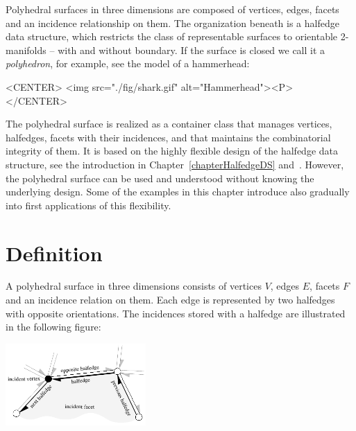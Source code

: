 Polyhedral surfaces in three dimensions are composed of vertices,
edges, facets and an incidence relationship on them. The organization
beneath is a halfedge data structure, which restricts the class of
representable surfaces to orientable 2-manifolds -- with and without
boundary. If the surface is closed we call it a {\em polyhedron}, for
example, see the  model of a hammerhead:

\begin{ccHtmlOnly}
    <CENTER>
        <img src="./fig/shark.gif" alt="Hammerhead"><P>
    </CENTER>
\end{ccHtmlOnly}

The polyhedral surface is realized as a container class that manages
vertices, halfedges, facets with their incidences, and that maintains
the combinatorial integrity of them. It is based on the highly
flexible design of the halfedge data structure, see the introduction
in Chapter~\ref{chapterHalfedgeDS} and~\cite{k-ugpdd-99}. However, the
polyhedral surface can be used and understood without knowing the
underlying design. Some of the examples in this chapter introduce also
gradually into first applications of this flexibility.

\section{Definition}
  
A polyhedral surface  in
three dimensions consists of vertices $V$, edges $E$, facets $F$ and
an incidence relation on them.  Each edge is represented by two
halfedges with opposite orientations. The incidences stored with a
halfedge are illustrated in the following figure:

\begin{ccTexOnly}
    \vspace{-7mm}
    \begin{center}
      \parbox{0.4\textwidth}{%
          \includegraphics[width=0.4\textwidth]{Polyhedron/fig/halfedge}%
      }
    \end{center}
    \vspace{-5mm}
\end{ccTexOnly}

